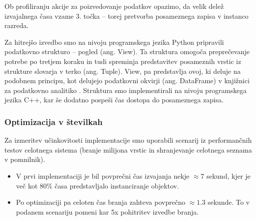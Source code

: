 \documentclass[a4paper,12pt,openright]{book}
\begin{document}
        \noindent
        Ob profiliranju akcije za poizvedovanje podatkov opazimo, da velik delež izvajalnega časa vzame 3. točka – torej pretvorba posameznega zapisa v instanco razreda.

        Za hitrejšo izvedbo smo na nivoju programskega jezika Python pripravili podatkovno strukturo – pogled (ang. View). Ta struktura omogoča preprečevanje potrebe po tretjem koraku in tudi spreminja predstavitev posameznih vrstic iz strukture slovarja v terko (ang. Tuple). View, pa predstavlja ovoj, ki deluje na podobnem principu, kot delujejo podatkovni okvirji (ang. DataFrame) v knjižnici za podatkovno analitiko \cite{PANDAS_GITHUB}. Struktura smo implementirali na nivoju programskega jezika C++, kar še dodatno pospeši čas dostopa do posameznega zapisa.

        \subsubsection{Optimizacija v številkah}
        Za izmeritev učinkovitosti implementacije smo uporabili scenarij iz performančnih testov celotnega sistema (branje milijona vrstic in shranjevanje celotnega seznama v pomnilnik).
        \begin{itemize}
            \item V prvi implementaciji je bil povprečni čas izvajanja nekje $\approx 7$ sekund, kjer je več kot 80\% časa predstavljalo instanciranje objektov.
            \item Po optimizaciji pa celoten čas branja zahteva povprečno $\approx 1.3$ sekunde. To v podanem scenariju pomeni kar 5x pohitritev izvedbe branja.
        \end{itemize}
\end{document}
